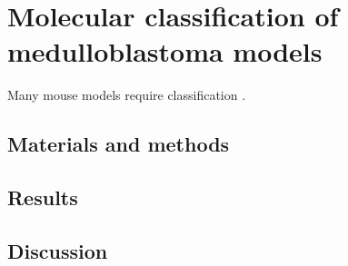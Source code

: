 \chapter{Molecular classification of medulloblastoma models}
\label{ch:mmu-mb-class}

Many mouse models require classification .

\section{Materials and methods}

\section{Results}

\section{Discussion}
